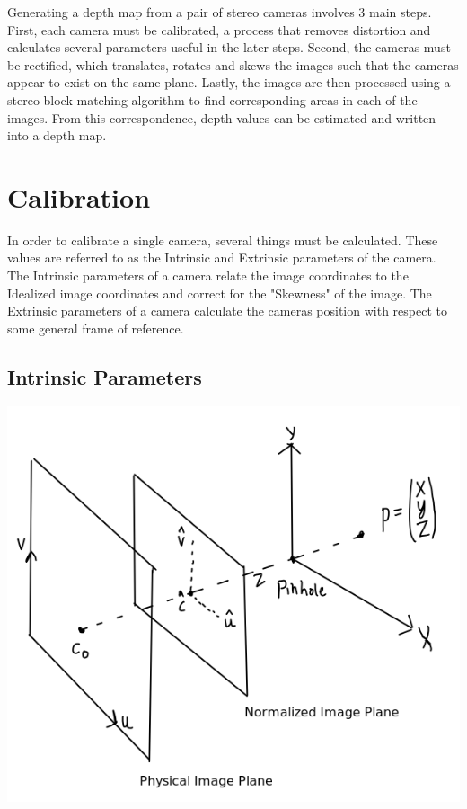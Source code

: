 
Generating a depth map from a pair of stereo cameras involves 3 main steps.  First, each camera must be calibrated, a process that removes distortion and calculates several parameters useful in the later steps.  Second, the cameras must be rectified, which translates, rotates and skews the images such that the cameras appear to exist on the same plane.  Lastly, the images are then processed using a stereo block matching algorithm to find corresponding areas in each of the images.  From this correspondence, depth values can be estimated and written into a depth map.

\section{Calibration}
In order to calibrate a single camera, several things must be calculated.  These values are referred to as the Intrinsic and Extrinsic parameters of the camera.  The Intrinsic parameters of a camera relate the image coordinates to the Idealized image coordinates and correct for the "Skewness" of the image. The Extrinsic parameters of a camera calculate the cameras position with respect to some general frame of reference.


\subsection{Intrinsic Parameters}
\includegraphics[width=\textwidth]{Image1}

